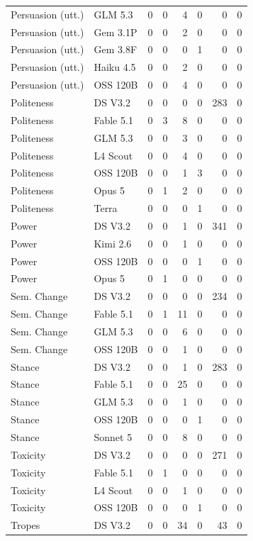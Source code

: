 \begin{longtable}{llrrrrrr}
Persuasion (utt.) & GLM 5.3 & 0 & 0 & 4 & 0 & 0 & 0 \\
Persuasion (utt.) & Gem 3.1P & 0 & 0 & 2 & 0 & 0 & 0 \\
Persuasion (utt.) & Gem 3.8F & 0 & 0 & 0 & 1 & 0 & 0 \\
Persuasion (utt.) & Haiku 4.5 & 0 & 0 & 2 & 0 & 0 & 0 \\
Persuasion (utt.) & OSS 120B & 0 & 0 & 4 & 0 & 0 & 0 \\
Politeness & DS V3.2 & 0 & 0 & 0 & 0 & 283 & 0 \\
Politeness & Fable 5.1 & 0 & 3 & 8 & 0 & 0 & 0 \\
Politeness & GLM 5.3 & 0 & 0 & 3 & 0 & 0 & 0 \\
Politeness & L4 Scout & 0 & 0 & 4 & 0 & 0 & 0 \\
Politeness & OSS 120B & 0 & 0 & 1 & 3 & 0 & 0 \\
Politeness & Opus 5 & 0 & 1 & 2 & 0 & 0 & 0 \\
Politeness & Terra & 0 & 0 & 0 & 1 & 0 & 0 \\
Power & DS V3.2 & 0 & 0 & 1 & 0 & 341 & 0 \\
Power & Kimi 2.6 & 0 & 0 & 1 & 0 & 0 & 0 \\
Power & OSS 120B & 0 & 0 & 0 & 1 & 0 & 0 \\
Power & Opus 5 & 0 & 1 & 0 & 0 & 0 & 0 \\
Sem. Change & DS V3.2 & 0 & 0 & 0 & 0 & 234 & 0 \\
Sem. Change & Fable 5.1 & 0 & 1 & 11 & 0 & 0 & 0 \\
Sem. Change & GLM 5.3 & 0 & 0 & 6 & 0 & 0 & 0 \\
Sem. Change & OSS 120B & 0 & 0 & 1 & 0 & 0 & 0 \\
Stance & DS V3.2 & 0 & 0 & 1 & 0 & 283 & 0 \\
Stance & Fable 5.1 & 0 & 0 & 25 & 0 & 0 & 0 \\
Stance & GLM 5.3 & 0 & 0 & 1 & 0 & 0 & 0 \\
Stance & OSS 120B & 0 & 0 & 0 & 1 & 0 & 0 \\
Stance & Sonnet 5 & 0 & 0 & 8 & 0 & 0 & 0 \\
Toxicity & DS V3.2 & 0 & 0 & 0 & 0 & 271 & 0 \\
Toxicity & Fable 5.1 & 0 & 1 & 0 & 0 & 0 & 0 \\
Toxicity & L4 Scout & 0 & 0 & 1 & 0 & 0 & 0 \\
Toxicity & OSS 120B & 0 & 0 & 0 & 1 & 0 & 0 \\
Tropes & DS V3.2 & 0 & 0 & 34 & 0 & 43 & 0 \\

\end{longtable}
